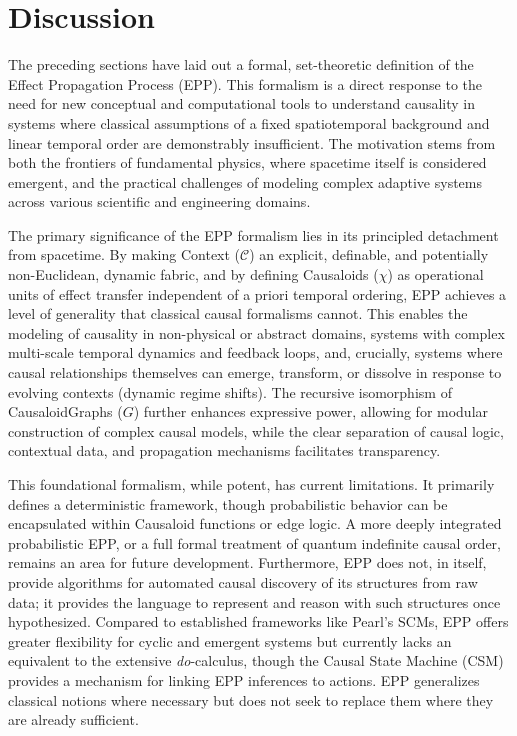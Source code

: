 \section[Discussion]{Discussion} 
\label{sec:discussion}


The preceding sections have laid out a formal, set-theoretic definition of the Effect Propagation Process (EPP). This formalism is a direct response to the need for new conceptual and computational tools to understand causality in systems where classical assumptions of a fixed spatiotemporal background and linear temporal order are demonstrably insufficient. The motivation stems from both the frontiers of fundamental physics, where spacetime itself is considered emergent, and the practical challenges of modeling complex adaptive systems across various scientific and engineering domains.

The primary significance of the EPP formalism lies in its principled detachment from spacetime. By making Context (\(\mathcal{C}\)) an explicit, definable, and potentially non-Euclidean, dynamic fabric, and by defining Causaloids (\(\chi\)) as operational units of effect transfer independent of a priori temporal ordering, EPP achieves a level of generality that classical causal formalisms cannot. This enables the modeling of causality in non-physical or abstract domains, systems with complex multi-scale temporal dynamics and feedback loops, and, crucially, systems where causal relationships themselves can emerge, transform, or dissolve in response to evolving contexts (dynamic regime shifts). The recursive isomorphism of CausaloidGraphs (\(G\)) further enhances expressive power, allowing for modular construction of complex causal models, while the clear separation of causal logic, contextual data, and propagation mechanisms facilitates transparency.

This foundational formalism, while potent, has current limitations. It primarily defines a deterministic framework, though probabilistic behavior can be encapsulated within Causaloid functions or edge logic. A more deeply integrated probabilistic EPP, or a full formal treatment of quantum indefinite causal order, remains an area for future development. Furthermore, EPP does not, in itself, provide algorithms for automated causal discovery of its structures from raw data; it provides the language to represent and reason with such structures once hypothesized. Compared to established frameworks like Pearl's SCMs, EPP offers greater flexibility for cyclic and emergent systems but currently lacks an equivalent to the extensive \textit{do}-calculus, though the Causal State Machine (CSM) provides a mechanism for linking EPP inferences to actions. EPP generalizes classical notions where necessary but does not seek to replace them where they are already sufficient.

